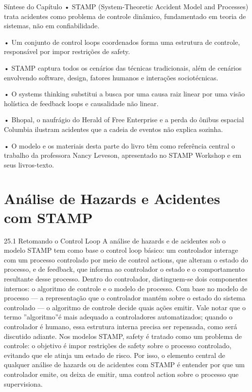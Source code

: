 Síntese do Capítulo • STAMP (System-Theoretic Accident Model and Processes) trata acidentes como problema de controle dinâmico, fundamentado em teoria de sistemas, não em confiabilidade.

• Um conjunto de control loops coordenados forma uma estrutura de controle, responsável por impor restrições de safety.

• STAMP captura todos os cenários das técnicas tradicionais, além de cenários envolvendo software, design, fatores humanos e interações sociotécnicas.

• O systems thinking substitui a busca por uma causa raiz linear por uma visão holística de feedback loops e causalidade não linear.

• Bhopal, o naufrágio do Herald of Free Enterprise e a perda do ônibus espacial Columbia ilustram acidentes que a cadeia de eventos não explica sozinha.

• O modelo e os materiais desta parte do livro têm como referência central o trabalho da professora Nancy Leveson, apresentado no STAMP Workshop e em seus livros-texto.

\chapter{Análise de Hazards e Acidentes com STAMP}

25.1 Retomando o Control Loop A análise de hazards e de acidentes sob o modelo STAMP tem como base o control loop básico: um controlador interage com um processo controlado por meio de control actions, que alteram o estado do processo, e de feedback, que informa ao controlador o estado e o comportamento resultante desse processo. Dentro do controlador, distinguem-se dois componentes internos: o algoritmo de controle e o modelo de processo. Com base no modelo de processo — a representação que o controlador mantém sobre o estado do sistema controlado — o algoritmo de controle decide quais ações emitir. Vale notar que o termo ”algoritmo”é mais adequado a controladores automatizados; quando o controlador é humano, essa estrutura interna precisa ser repensada, como será discutido adiante. Nos modelos STAMP, safety é tratado como um problema de controle: o objetivo é impor restrições de safety sobre o processo controlado, evitando que ele atinja um estado de risco. Por isso, o elemento central de qualquer análise de hazards ou de acidentes com STAMP é entender por que um controlador emite, ou deixa de emitir, uma control action sobre o processo que supervisiona.

